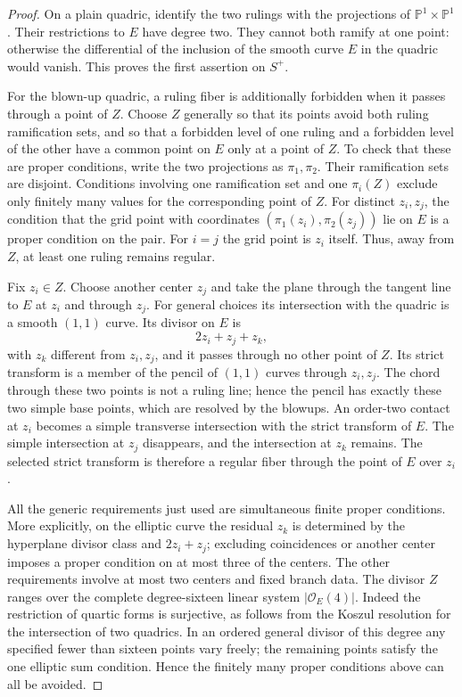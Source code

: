 \begin{proof}
On a plain quadric, identify the two rulings with the projections
of $\mathbb P^1\times\mathbb P^1$.  Their restrictions to $E$ have
degree two.  They cannot both ramify at one point: otherwise the
differential of the inclusion of the smooth curve $E$ in the
quadric would vanish.  This proves the first assertion on $S^+$.

For the blown-up quadric, a ruling fiber is additionally forbidden
when it passes through a point of $Z$.  Choose $Z$ generally so
that its points avoid both ruling ramification sets, and so
that a forbidden level of one ruling and a forbidden level of the
other have a common point on $E$ only at a point of $Z$.  To check
that these are proper conditions, write the two projections as
$\pi_1,\pi_2$.  Their ramification sets are disjoint.  Conditions
involving one ramification set and one $\pi_i(Z)$ exclude only
finitely many values for the corresponding point of $Z$.  For
distinct $z_i,z_j$, the condition that the grid point with
coordinates $(\pi_1(z_i),\pi_2(z_j))$ lie on $E$ is a proper
condition on the pair.  For $i=j$ the grid point is $z_i$ itself.
Thus, away from $Z$, at least one ruling remains regular.

Fix $z_i\in Z$.  Choose another center $z_j$ and take the plane
through the tangent line to $E$ at $z_i$ and through $z_j$.  For
general choices its intersection with the quadric is a smooth
$(1,1)$ curve.  Its divisor on $E$ is
\[
                        2z_i+z_j+z_k,
\]
with $z_k$ different from $z_i,z_j$, and it passes through no other
point of $Z$.  Its strict transform is a member of the pencil of
$(1,1)$ curves through $z_i,z_j$.  The chord through these two
points is not a ruling line; hence the pencil has exactly these
two simple base points, which are resolved by the blowups.  An
order-two contact at $z_i$ becomes a simple transverse
intersection with the strict transform of $E$.  The simple
intersection at $z_j$ disappears, and the intersection at $z_k$
remains.  The selected strict transform is therefore a regular
fiber through the point of $E$ over $z_i$.

All the generic requirements just used are simultaneous finite
proper conditions.  More explicitly, on the elliptic curve the
residual $z_k$ is determined by the hyperplane divisor class and
$2z_i+z_j$; excluding coincidences or another center imposes a
proper condition on at most three of the centers.  The other
requirements involve at most two centers and fixed branch data.
The divisor $Z$ ranges over the complete degree-sixteen linear
system $|\mathcal O_E(4)|$.  Indeed the restriction of quartic
forms is surjective, as follows from the Koszul resolution for
the intersection of two quadrics.  In an ordered general divisor
of this degree any specified fewer than sixteen points vary
freely; the remaining points satisfy the one elliptic sum
condition.  Hence the finitely many proper conditions above can
all be avoided.


\end{proof}
